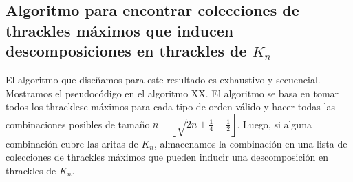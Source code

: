 \subsection{Algoritmo para encontrar colecciones de thrackles máximos que
inducen descomposiciones en thrackles de $K_n$}\label{secc:descomposicion_thrackles_maximos}
  El algoritmo que diseñamos para este resultado es exhaustivo y secuencial.
  Mostramos el pseudocódigo en el algoritmo XX. %
  El algoritmo se basa en tomar todos los thracklese máximos para cada tipo de
  orden válido y hacer todas las combinaciones posibles de tamaño $n -
  \left\lfloor\sqrt{2n+\frac{1}{4}} + \frac{1}{2}\right\rfloor$. Luego, si
  alguna combinación cubre las aritas de $K_n$, almacenamos la combinación en
  una lista de colecciones de thrackles máximos que pueden inducir una
  descomposición en thrackles de $K_n$.

